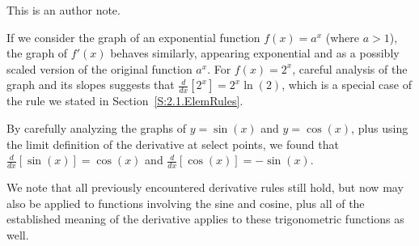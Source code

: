

\begin{authornote}
This is an author note.
\end{authornote}


\begin{summary}
\item If we consider the graph of an exponential function $f(x) = a^x$ (where $a > 1$), the graph of $f'(x)$ behaves similarly, appearing exponential and as a possibly scaled version of the original function $a^x$.  For $f(x) = 2^x$, careful analysis of the graph and its slopes suggests that $\frac{d}{dx}[2^x] = 2^x \ln(2)$, which is a special case of the rule we stated in Section~\ref{S:2.1.ElemRules}.
\item By carefully analyzing the graphs of $y = \sin(x)$ and $y = \cos(x)$, plus using the limit definition of the derivative at select points, we found that $\frac{d}{dx} [\sin(x)] = \cos(x)$ and $\frac{d}{dx} [\cos(x)] = -\sin(x)$.
\item We note that all previously encountered derivative rules still hold, but now may also be applied to functions involving the sine and cosine, plus all of the established meaning of the derivative applies to these trigonometric functions as well.
\end{summary}

\nin \hrulefill

 

\clearpage